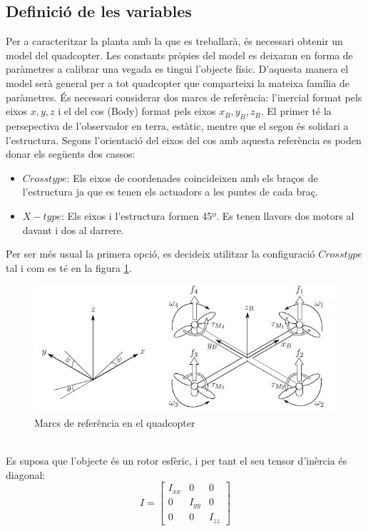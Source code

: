 \documentclass[twoside]{article}
\begin{document}
\subsection{Definició de les variables}
Per a caracteritzar la planta amb la que es treballarà, és necessari obtenir un model del quadcopter. Les constants pròpies del model es deixaran en forma de paràmetres a calibrar una vegada es tingui l'objecte físic. D'aquesta manera el model serà general per a tot quadcopter que comparteixi la mateixa família de paràmetres.
És necessari considerar dos marcs de referència: l'inercial format pels eixos $x,y,z$ i el del cos (Body) format pels eixos $x_B,y_B,z_B$. El primer té la persepectiva de l'observador en terra, estàtic, mentre que el segon és solidari a l'estructura. Segons l'orientació del eixos del cos amb aquesta referència es poden donar els següents dos cassos:
\begin{itemize}
\item $Cross type$: Els eixos de coordenades coincideixen amb els braços de l'estructura ja que es tenen els actuadors a les puntes de cada braç.
\item $X-type$: Els eixos i l'estructura formen 45º. Es tenen llavors dos motors al davant i dos al darrere.
\end{itemize} 
Per ser més usual la primera opció, es decideix utilitzar la configuració $Cross type$ tal i com es té en la figura \ref{RefQuad}.
\begin{figure}[h!]
\centering
\includegraphics[scale=0.5]{quad.jpg}
\caption{Marcs de referència en el quadcopter}
\label{RefQuad}
\end{figure}\\
Es suposa que l'objecte és un rotor esfèric, i per tant el seu tensor d'inèrcia és diagonal:
\begin{equation}I=\left[ \begin{array}{ccc}
I_{xx} & 0 & 0 \\
0 & I_{yy} & 0 \\
0 & 0 & I_{zz} 
\end{array} \right] \end{equation}
\end{document}

